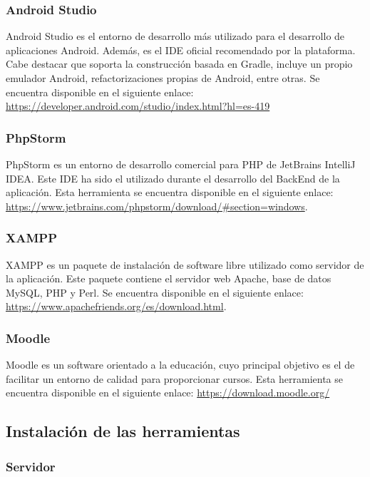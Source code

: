 \subsubsection{Android Studio}

Android Studio es el entorno de desarrollo más utilizado para el desarrollo de aplicaciones Android. Además, es el IDE oficial recomendado por la plataforma. Cabe destacar que soporta la construcción basada en Gradle, incluye un propio emulador Android, refactorizaciones propias de Android, entre otras. Se encuentra disponible en el siguiente enlace: \url{https://developer.android.com/studio/index.html?hl=es-419}

\subsubsection{PhpStorm}

PhpStorm es un entorno de desarrollo comercial para PHP de JetBrains IntelliJ IDEA. Este IDE ha sido el utilizado durante el desarrollo del BackEnd de la aplicación. Esta herramienta se encuentra disponible en el siguiente enlace: \url{https://www.jetbrains.com/phpstorm/download/#section=windows}.
\subsubsection{XAMPP}

XAMPP es un paquete de instalación de software libre utilizado como servidor de la aplicación. Este paquete contiene el servidor web Apache, base de datos MySQL, PHP y Perl. Se encuentra disponible en el siguiente enlace: \url{https://www.apachefriends.org/es/download.html}.

\subsubsection{Moodle}

Moodle es un software orientado a la educación, cuyo principal objetivo es el de facilitar un entorno de calidad para proporcionar cursos. Esta herramienta se encuentra disponible en el siguiente enlace: \url{https://download.moodle.org/}

\subsection{Instalación de las herramientas}\label{subsubsec:InstHerramientas}


\subsubsection{Servidor}

